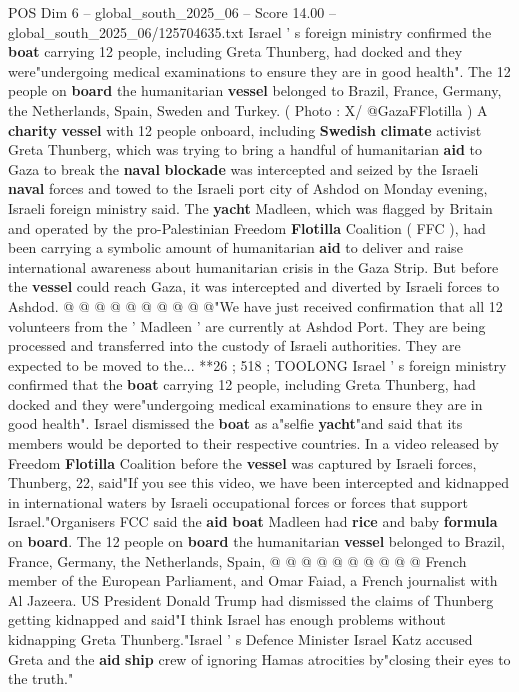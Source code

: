 \begin{textsample}{POS Dim 6 – global\_south\_2025\_06 – Score 14.00 – global\_south\_2025\_06/125704635.txt}  \label{ex:f6_pos_013}
Israel ' s foreign ministry confirmed the \textbf{boat} carrying 12 people, including Greta Thunberg, had docked and they were"undergoing medical examinations to ensure they are in good health".
The 12 people on \textbf{board} the humanitarian \textbf{vessel} belonged to Brazil, France, Germany, the Netherlands, Spain, Sweden and Turkey. ( Photo : X/ @GazaFFlotilla ) A \textbf{charity} \textbf{vessel} with 12 people onboard, including \textbf{Swedish} \textbf{climate} activist Greta Thunberg, which was trying to bring a handful of humanitarian \textbf{aid} to Gaza to break the \textbf{naval} \textbf{blockade} was intercepted and seized by the Israeli \textbf{naval} forces and towed to the Israeli port city of Ashdod on Monday evening, Israeli foreign ministry said.
The \textbf{yacht} Madleen, which was flagged by Britain and operated by the pro-Palestinian Freedom \textbf{Flotilla} Coalition ( FFC ), had been carrying a symbolic amount of humanitarian \textbf{aid} to deliver and raise international awareness about humanitarian crisis in the Gaza Strip.
But before the \textbf{vessel} could reach Gaza, it was intercepted and diverted by Israeli forces to Ashdod. @ @ @ @ @ @ @ @ @ @"We have just received confirmation that all 12 volunteers from the ' Madleen ' are currently at Ashdod Port.
They are being processed and transferred into the custody of Israeli authorities.
They are expected to be moved to the... **26 ; 518 ; TOOLONG Israel ' s foreign ministry confirmed that the \textbf{boat} carrying 12 people, including Greta Thunberg, had docked and they were"undergoing medical examinations to ensure they are in good health".
Israel dismissed the \textbf{boat} as a"selfie \textbf{yacht}"and said that its members would be deported to their respective countries.
In a video released by Freedom \textbf{Flotilla} Coalition before the \textbf{vessel} was captured by Israeli forces, Thunberg, 22, said"If you see this video, we have been intercepted and kidnapped in international waters by Israeli occupational forces or forces that support Israel."Organisers FCC said the \textbf{aid} \textbf{boat} Madleen had \textbf{rice} and baby \textbf{formula} on \textbf{board}.
The 12 people on \textbf{board} the humanitarian \textbf{vessel} belonged to Brazil, France, Germany, the Netherlands, Spain, @ @ @ @ @ @ @ @ @ @ French member of the European Parliament, and Omar Faiad, a French journalist with Al Jazeera.
US President Donald Trump had dismissed the claims of Thunberg getting kidnapped and said"I think Israel has enough problems without kidnapping Greta Thunberg."Israel ' s Defence Minister Israel Katz accused Greta and the \textbf{aid} \textbf{ship} crew of ignoring Hamas atrocities by"closing their eyes to the truth."

\end{textsample}

